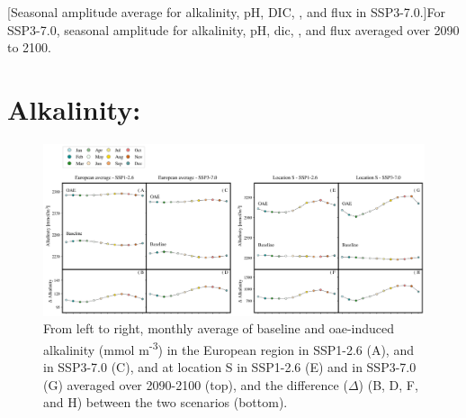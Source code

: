 \begin{center}

\begin{table}[H]
[Seasonal amplitude average for alkalinity, pH, \texorpdfstring{DIC}{DIC}, , and  flux in SSP3-7.0.]{For SSP3-7.0, seasonal amplitude for alkalinity, pH, \ac{dic}, , and  flux averaged over 2090 to 2100.\label{amplSum70}}

\end{table}

\end{center}

\section{Alkalinity:}

\begin{figure}[H]
\caption[Monthly average of baseline and \texorpdfstring{OAE}{OAE}-induced alkalinity]{From left to right, monthly average of baseline and \ac{oae}-induced alkalinity (mmol m\textsuperscript{-3}) in the European region in SSP1-2.6 (A), and in SSP3-7.0 (C), and at location S in SSP1-2.6 (E) and in SSP3-7.0 (G) averaged over 2090-2100 (top), and the difference ($\Delta$) (B, D, F, and H) between the two scenarios (bottom).}
\label{alkalinity}
\centering
\includegraphics[width=15cm]{fig/3_Results/Alkalinity/alkalinity.png}

\end{figure}

